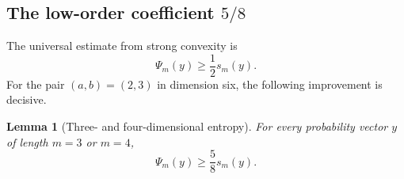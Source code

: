 \documentclass[11pt]{article}
\numberwithin{equation}{section}
\newtheorem{lemma}[theorem]{Lemma}
\theoremstyle{definition}
\begin{document}
\subsection{The low-order coefficient \texorpdfstring{$5/8$}{5/8}}

The universal estimate from strong convexity is
\begin{equation}
 \Psi_m(y)\ge\frac12s_m(y).\label{n6:eq:half-entropy}
\end{equation}
For the pair $(a,b)=(2,3)$ in dimension six, the following improvement is
decisive.

\begin{lemma}[Three- and four-dimensional entropy]\label{n6:lem:five-eighths}
For every probability vector $y$ of length $m=3$ or $m=4$,
\begin{equation}
 \Psi_m(y)\ge\frac58s_m(y).\label{n6:eq:five-eighths}
\end{equation}
\end{lemma}
\end{document}
